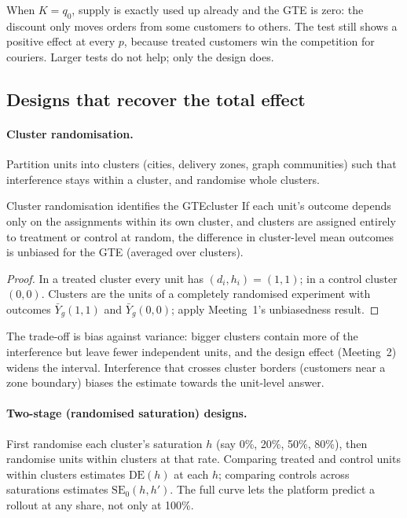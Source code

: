 \documentclass[11pt]{article}
\begin{document}
When $K = q_0$, supply is exactly used up already and the GTE is zero: the discount only moves orders from some
customers to others. The test still shows a positive effect at every $p$, because treated customers win the
competition for couriers. Larger tests do not help; only the design does.

\subsection{Designs that recover the total effect}

\paragraph{Cluster randomisation.} Partition units into clusters (cities, delivery zones, graph communities) such
that interference stays within a cluster, and randomise whole clusters.

\begin{prop}{Cluster randomisation identifies the GTE}{cluster}
If each unit's outcome depends only on the assignments within its own cluster, and clusters are assigned entirely to
treatment or control at random, the difference in cluster-level mean outcomes is unbiased for the GTE (averaged over
clusters).
\end{prop}
\begin{proof}
In a treated cluster every unit has $(d_i, h_i) = (1,1)$; in a control cluster $(0,0)$. Clusters are the units of a
completely randomised experiment with outcomes $\bar Y_g(1,1)$ and $\bar Y_g(0,0)$; apply Meeting~1's unbiasedness
result.
\end{proof}

The trade-off is bias against variance: bigger clusters contain more of the interference but leave fewer
independent units, and the design effect (Meeting~2) widens the interval. Interference that crosses cluster
borders (customers near a zone boundary) biases the estimate towards the unit-level answer.

\paragraph{Two-stage (randomised saturation) designs.} First randomise each cluster's saturation $h$ (say 0\%, 20\%,
50\%, 80\%), then randomise units within clusters at that rate. Comparing treated and control units within clusters
estimates $\text{DE}(h)$ at each $h$; comparing controls across saturations estimates $\text{SE}_0(h, h')$. The full curve
lets the platform predict a rollout at any share, not only at 100\%.
\end{document}
